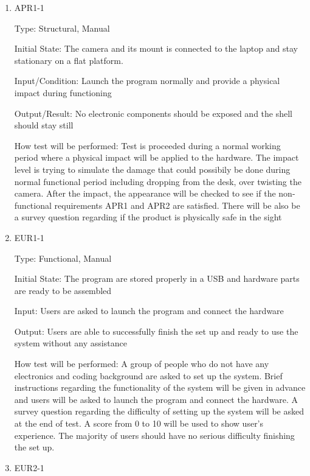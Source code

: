 \documentclass[12pt, titlepage]{article}
\begin{document}
\begin{enumerate}

\item{APR1-1\\}

Type: Structural, Manual
					
Initial State: The camera and its mount is connected to the laptop and stay stationary on a flat platform.
					
Input/Condition: Launch the program normally and provide a physical impact during functioning
					
Output/Result: No electronic components should be exposed and the shell should stay still
					
How test will be performed: Test is proceeded during a normal working period where a physical impact will be applied to the hardware. The impact level is trying to simulate the damage that could possibily be done during normal functional period including dropping from the desk, over twisting the camera. After the impact, the appearance will be checked to see if the non-functional
requirements APR1 and APR2 are satisfied. There will be also be a survey question regarding if the product is physically safe in the sight
					
\item{EUR1-1\\}

Type: Functional, Manual
					
Initial State: The program are stored properly in a USB and hardware parts are ready to be assembled
					
Input: Users are asked to launch the program and connect the hardware 
					
Output: Users are able to successfully finish the set up and ready to use the system without any assistance
					
How test will be performed: A group of people who do not have any electronics and coding background are asked to set up the system. Brief instructions regarding the functionality of the system will be given in advance and users will be asked to launch the program and connect the hardware. A survey question regarding the difficulty of setting up the system will be asked at the end of test. A score from 0 to 10 will be used to show user's experience. The majority of users should have no serious difficulty finishing the set up.

\item{EUR2-1\\}


\end{enumerate}
\end{document}

